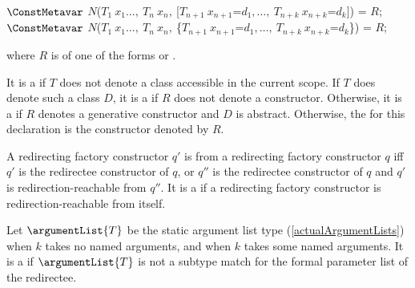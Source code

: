 \documentclass[makeidx]{article}
\begin{document}
\begin{normativeDartCode}
$\ConstMetavar$ \FACTORY{}
    $N$($T_1\ x_1 \ldots,\ T_n\ x_n,\ $[$T_{n+1}\ x_{n+1}$=$d_1, \ldots,\ T_{n+k}\ x_{n+k}$=$d_k$]) = $R$;
\\
$\ConstMetavar$ \FACTORY{}
    $N$($T_1\ x_1 \ldots,\ T_n\ x_n,\ $\{$T_{n+1}\ x_{n+1}$=$d_1, \ldots,\ T_{n+k}\ x_{n+k}$=$d_k$\}) = $R$;
\end{normativeDartCode}

\noindent
{}%
where $R$ is of one of the forms
 or
.

\LMHash{}%
It is a  if $T$ does not denote
a class accessible in the current scope.
If $T$ does denote such a class $D$,
it is a  if $R$ does not denote a constructor.
Otherwise, it is a 
if $R$ denotes a generative constructor and $D$ is abstract.
Otherwise, the
for this declaration is the constructor  denoted by $R$.

\LMHash{}%
A redirecting factory constructor $q'$ is 
from a redirecting factory constructor $q$ if{}f
$q'$ is the redirectee constructor of $q$,
or $q''$ is the redirectee constructor of $q$
and $q'$ is redirection-reachable from $q''$.
It is a  if a redirecting factory constructor
is redirection-reachable from itself.

\LMHash{}%
Let $\argumentList{T}$ be the static argument list type
(\ref{actualArgumentLists})
when $k$ takes no named arguments, and
when $k$ takes some named arguments.
It is a  if $\argumentList{T}$
is not a subtype match for the formal parameter list of the redirectee.

\end{document}

